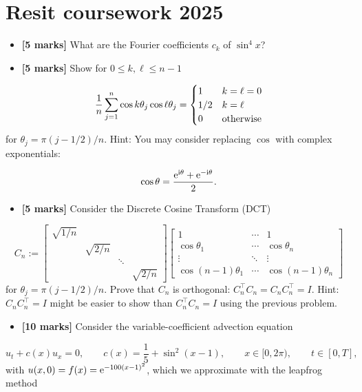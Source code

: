 \documentclass[12pt,a4paper]{article}
\begin{document}
\section*{Resit coursework 2025}
\begin{itemize}
\item[1. ] \textbf{[5 marks]} What are the Fourier coefficients $c_k$ of $\sin^4 x$?


\item[2. ] \textbf{[5 marks]} Show for $0 \leq k,\ell \leq n-1$

\end{itemize}
\[
{1 \over n} \sum_{j=1}^n \cos k \theta_j \cos \ell \theta_j = \begin{cases} 1 & k = \ell = 0 \\
                                                  1/2 & k = \ell \\
                                                  0 & \hbox{otherwise}
                                                  \end{cases}
\]
for $\theta_j = \pi (j-1/2)/n$. Hint:     You may consider replacing $\cos$ with     complex exponentials:

\[
\cos \theta = {{\rm e}^{{\rm i}\theta} + {\rm e}^{-{\rm i}\theta} \over 2}.
\]
\begin{itemize}
\item[3. ] \textbf{[5 marks]} Consider the Discrete Cosine Transform (DCT)

\end{itemize}
\[
C_n := \begin{bmatrix}
\sqrt{1/n} \\
 & \sqrt{2/n} \\ 
 && \ddots \\
 &&& \sqrt{2/n}
 \end{bmatrix}
\begin{bmatrix}
    1 & \cdots & 1\\
    \cos \theta_1 & \cdots & \cos \theta_n \\
    \vdots & \ddots & \vdots \\
    \cos (n-1)\theta_1 & \cdots & \cos (n-1)\theta_n
\end{bmatrix}
\]
for $\theta_j = \pi(j-1/2)/n$. Prove that $C_n$ is orthogonal: $C_n^{\top} C_n = C_n C_n^{\top} = I$. Hint: $C_n C_n^{\top} = I$ might be easier to show than $C_n^{\top} C_n = I$ using the previous problem.

\begin{itemize}
\item[4. ] \textbf{[10 marks]}  Consider the variable-coefficient advection equation

\end{itemize}
\[
   u_t + c(x)u_x = 0, \qquad c(x) = \frac{1}{5} + \sin^2(x-1), \qquad x \in [0, 2\pi), \qquad t \in [0, T],
\]
with $u(x,0) = f(x) = {\rm e}^{-100(x-1)^2}$, which we approximate with the leapfrog method
\end{document}
